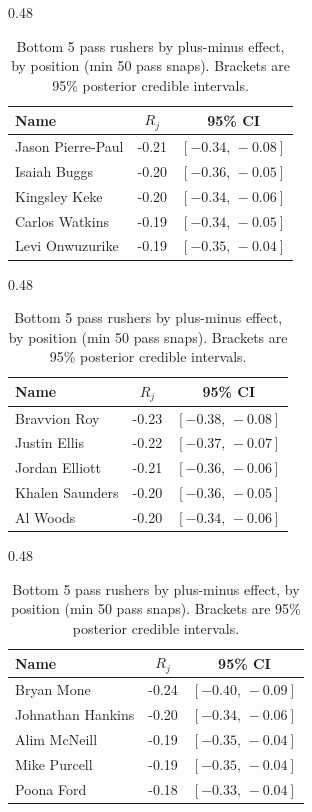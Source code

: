 \begin{table}[h!]
\centering
\begin{subtable}{0.48\textwidth}
\centering
\footnotesize
\begin{tabular}{lcc}
\toprule
Name & $R_j$ & 95\% CI \\
\midrule
Jason Pierre-Paul & -0.21 & $[-0.34,\,-0.08]$ \\
Isaiah Buggs & -0.20 & $[-0.36,\,-0.05]$ \\
Kingsley Keke & -0.20 & $[-0.34,\,-0.06]$ \\
Carlos Watkins & -0.19 & $[-0.34,\,-0.05]$ \\
Levi Onwuzurike & -0.19 & $[-0.35,\,-0.04]$ \\
\bottomrule
\end{tabular}
\caption{Edge}
\end{subtable}
\hfill
\begin{subtable}{0.48\textwidth}
\centering
\footnotesize
\begin{tabular}{lcc}
\toprule
Name & $R_j$ & 95\% CI \\
\midrule
Bravvion Roy & -0.23 & $[-0.38,\,-0.08]$ \\
Justin Ellis & -0.22 & $[-0.37,\,-0.07]$ \\
Jordan Elliott & -0.21 & $[-0.36,\,-0.06]$ \\
Khalen Saunders & -0.20 & $[-0.36,\,-0.05]$ \\
Al Woods & -0.20 & $[-0.34,\,-0.06]$ \\
\bottomrule
\end{tabular}
\caption{DT}
\end{subtable}

\bigskip
\begin{subtable}{0.48\textwidth}
\centering
\footnotesize
\begin{tabular}{lcc}
\toprule
Name & $R_j$ & 95\% CI \\
\midrule
Bryan Mone & -0.24 & $[-0.40,\,-0.09]$ \\
Johnathan Hankins & -0.20 & $[-0.34,\,-0.06]$ \\
Alim McNeill & -0.19 & $[-0.35,\,-0.04]$ \\
Mike Purcell & -0.19 & $[-0.35,\,-0.04]$ \\
Poona Ford & -0.18 & $[-0.33,\,-0.04]$ \\
\bottomrule
\end{tabular}
\caption{NT}
\end{subtable}
\caption{Bottom 5 pass rushers by plus-minus effect, by position (min 50 pass snaps). Brackets are 95\% posterior credible intervals.}
\label{tab:rusher_pm_bot}
\end{table}
